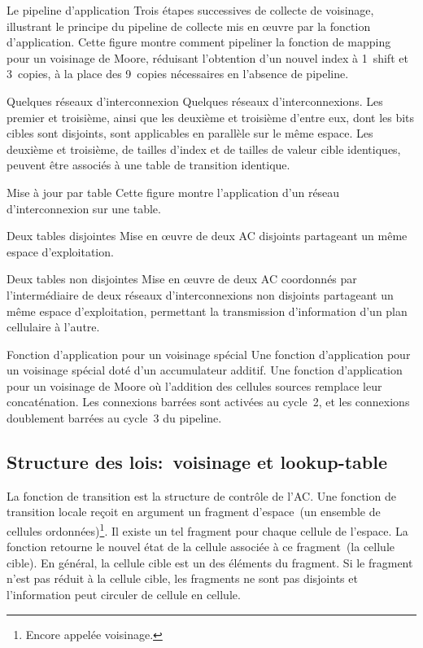 %
{Le pipeline d'application}%
{Trois étapes successives de collecte de voisinage, illustrant le
  principe du pipeline de collecte mis en œuvre par la fonction
  d'application.}%
{Cette figure montre comment pipeliner la fonction de mapping pour un
  voisinage de Moore, réduisant l'obtention d'un nouvel index à
  1~shift et 3~copies, à la place des 9~copies
  nécessaires en l'absence de pipeline. %
  }

%
{}%
{Quelques réseaux d'interconnexion}%
{Quelques réseaux d'interconnexions. %
  Les premier et troisième, ainsi que les deuxième et troisième
  d'entre eux, dont les bits cibles sont disjoints, sont applicables
  en parallèle sur le même espace. %
  Les deuxième et troisième, de tailles d'index et de tailles de valeur
  cible identiques, peuvent être associés à une table de transition
  identique.}

%
{}%
{Mise à jour par table}%
{Cette figure montre l'application d'un réseau d'interconnexion sur
  une table.}

%
{}%
{Deux tables disjointes}%
{Mise en œuvre de deux AC disjoints partageant un même espace
  d'exploitation.}

%
{}%
{Deux tables non disjointes}%
{Mise en œuvre de deux AC coordonnés par l'intermédiaire de deux
  réseaux d'interconnexions non disjoints partageant un même espace
  d'exploitation, permettant la transmission d'information d'un plan
  cellulaire à l'autre.}

%
{Fonction d'application pour un voisinage spécial}%
{Une fonction d'application pour un voisinage spécial doté d'un
  accumulateur additif.}%
{Une fonction d'application pour un voisinage de Moore où l'addition
  des cellules sources remplace leur concaténation. %
  Les connexions barrées sont activées au cycle~2, et les connexions
  doublement barrées au cycle~3 du pipeline.}

\subsection{Structure des lois:~voisinage et lookup-table}

La fonction de transition est la structure de contrôle de l'AC\@. %
Une fonction de transition locale reçoit en argument un fragment
d'espace~(un ensemble de cellules ordonnées)\footnote{%
  Encore appelée voisinage.}. %
Il existe un tel fragment pour chaque cellule de l'espace. %
La fonction retourne le nouvel état de la cellule associée à ce
fragment~(la cellule cible). %
En général, la cellule cible est un des éléments du fragment. %
Si le fragment n'est pas réduit à la cellule cible, les fragments ne
sont pas disjoints et l'information peut circuler de cellule en
cellule. %

